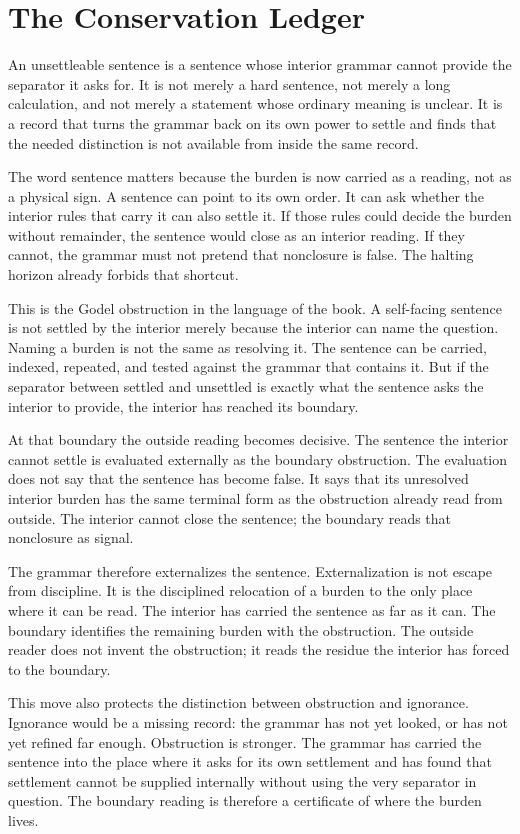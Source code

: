 \section{The Conservation Ledger}

An unsettleable sentence is a sentence whose interior grammar cannot provide
the separator it asks for. It is not merely a hard sentence, not merely a
long calculation, and not merely a statement whose ordinary meaning is
unclear. It is a record that turns the grammar back on its own power to
settle and finds that the needed distinction is not available from inside the
same record.

The word sentence matters because the burden is now carried as a reading, not
as a physical sign. A sentence can point to its own order. It can ask whether
the interior rules that carry it can also settle it. If those rules could
decide the burden without remainder, the sentence would close as an interior
reading. If they cannot, the grammar must not pretend that nonclosure is
false. The halting horizon already forbids that shortcut.

This is the Godel obstruction in the language of the book. A self-facing
sentence is not settled by the interior merely because the interior can name
the question. Naming a burden is not the same as resolving it. The sentence
can be carried, indexed, repeated, and tested against the grammar that
contains it. But if the separator between settled and unsettled is exactly
what the sentence asks the interior to provide, the interior has reached its
boundary.

At that boundary the outside reading becomes decisive. The sentence the
interior cannot settle is evaluated externally as the boundary obstruction.
The evaluation does not say that the sentence has become false. It says that
its unresolved interior burden has the same terminal form as the obstruction
already read from outside. The interior cannot close the sentence; the
boundary reads that nonclosure as signal.

The grammar therefore externalizes the sentence. Externalization is not
escape from discipline. It is the disciplined relocation of a burden to the
only place where it can be read. The interior has carried the sentence as
far as it can. The boundary identifies the remaining burden with the
obstruction. The outside reader does not invent the obstruction; it reads the
residue the interior has forced to the boundary.

This move also protects the distinction between obstruction and ignorance.
Ignorance would be a missing record: the grammar has not yet looked, or has
not yet refined far enough. Obstruction is stronger. The grammar has carried
the sentence into the place where it asks for its own settlement and has
found that settlement cannot be supplied internally without using the very
separator in question. The boundary reading is therefore a certificate of
where the burden lives.

